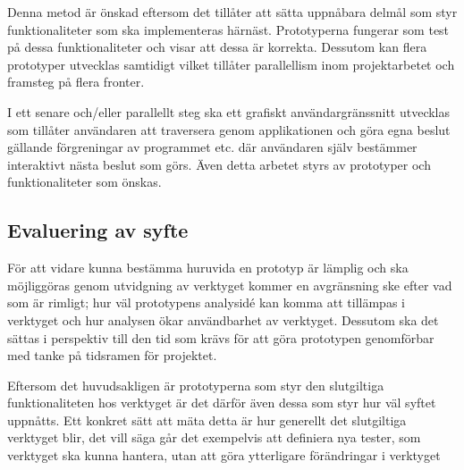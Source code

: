 Denna metod är önskad eftersom det tillåter att sätta uppnåbara delmål som styr
funktionaliteter som ska implementeras härnäst. Prototyperna fungerar som test på dessa
funktionaliteter och visar att dessa är korrekta. Dessutom kan flera prototyper 
utvecklas samtidigt vilket tillåter parallellism inom projektarbetet och
framsteg på flera fronter.

I ett senare och/eller parallellt steg ska ett grafiskt användargränssnitt
utvecklas som tillåter användaren att traversera genom applikationen och göra
egna beslut gällande förgreningar av programmet etc. där användaren själv
bestämmer interaktivt nästa beslut som görs. Även detta arbetet styrs av
prototyper och funktionaliteter som önskas.

\subsection{Evaluering av syfte}
För att vidare kunna bestämma huruvida en prototyp är lämplig och ska möjliggöras
genom utvidgning av verktyget kommer en avgränsning ske efter vad som är rimligt;
hur väl prototypens analysidé kan komma att tillämpas i verktyget och hur analysen
ökar användbarhet av verktyget. Dessutom ska det sättas i perspektiv till den tid
som krävs för att göra prototypen genomförbar med tanke på tidsramen för projektet.

Eftersom det huvudsakligen är prototyperna som styr den slutgiltiga
funktionaliteten hos verktyget är det därför även dessa som styr hur väl syftet
uppnåtts. Ett konkret sätt att mäta detta är hur generellt det slutgiltiga
verktyget blir, det vill säga går det exempelvis att definiera nya tester, som verktyget
ska kunna hantera, utan att göra ytterligare förändringar i verktyget 




%
